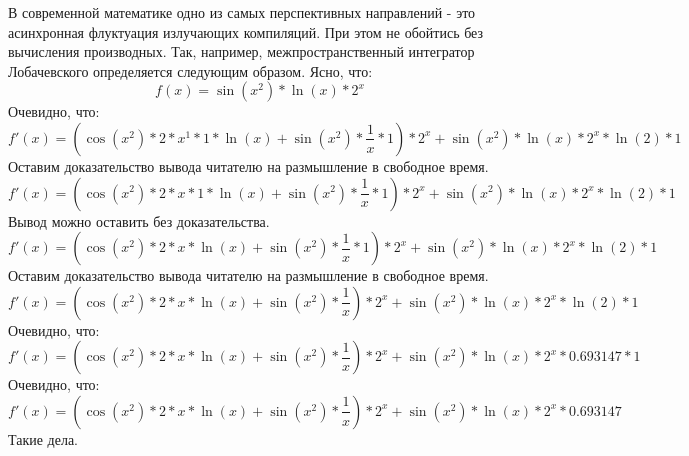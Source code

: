\documentclass{article}
\begin{document}
 

В современной математике одно из самых перспективных направлений - это асинхронная флуктуация излучающих компиляций. При этом не обойтись без вычисления производных. Так, например, межпространственный интегратор Лобачевского определяется следующим образом.
Ясно, что:
\begin{equation*}
f(x) = {{\sin\left({{x}^{2}}\right)} * {\ln\left({x}\right)}} * {{2}^{x}}
\end{equation*}
Очевидно, что:
\begin{equation*}
f'(x) = {{\left({{{\cos\left({{x}^{2}}\right)} * {{{2} * {{x}^{1}}} * {1}}} * {\ln\left({x}\right)}} + {{\sin\left({{x}^{2}}\right)} * {{\frac{1}{x}} * {1}}}\right)} * {{2}^{x}}} + {{{\sin\left({{x}^{2}}\right)} * {\ln\left({x}\right)}} * {{{{2}^{x}} * {\ln\left({2}\right)}} * {1}}}
\end{equation*}
Оставим доказательство вывода читателю на размышление в свободное время.
\begin{equation*}
f'(x) = {{\left({{{\cos\left({{x}^{2}}\right)} * {{{2} * {x}} * {1}}} * {\ln\left({x}\right)}} + {{\sin\left({{x}^{2}}\right)} * {{\frac{1}{x}} * {1}}}\right)} * {{2}^{x}}} + {{{\sin\left({{x}^{2}}\right)} * {\ln\left({x}\right)}} * {{{{2}^{x}} * {\ln\left({2}\right)}} * {1}}}
\end{equation*}
Вывод можно оставить без доказательства.
\begin{equation*}
f'(x) = {{\left({{{\cos\left({{x}^{2}}\right)} * {{2} * {x}}} * {\ln\left({x}\right)}} + {{\sin\left({{x}^{2}}\right)} * {{\frac{1}{x}} * {1}}}\right)} * {{2}^{x}}} + {{{\sin\left({{x}^{2}}\right)} * {\ln\left({x}\right)}} * {{{{2}^{x}} * {\ln\left({2}\right)}} * {1}}}
\end{equation*}
Оставим доказательство вывода читателю на размышление в свободное время.
\begin{equation*}
f'(x) = {{\left({{{\cos\left({{x}^{2}}\right)} * {{2} * {x}}} * {\ln\left({x}\right)}} + {{\sin\left({{x}^{2}}\right)} * {\frac{1}{x}}}\right)} * {{2}^{x}}} + {{{\sin\left({{x}^{2}}\right)} * {\ln\left({x}\right)}} * {{{{2}^{x}} * {\ln\left({2}\right)}} * {1}}}
\end{equation*}
Очевидно, что:
\begin{equation*}
f'(x) = {{\left({{{\cos\left({{x}^{2}}\right)} * {{2} * {x}}} * {\ln\left({x}\right)}} + {{\sin\left({{x}^{2}}\right)} * {\frac{1}{x}}}\right)} * {{2}^{x}}} + {{{\sin\left({{x}^{2}}\right)} * {\ln\left({x}\right)}} * {{{{2}^{x}} * {0.693147}} * {1}}}
\end{equation*}
Очевидно, что:
\begin{equation*}
f'(x) = {{\left({{{\cos\left({{x}^{2}}\right)} * {{2} * {x}}} * {\ln\left({x}\right)}} + {{\sin\left({{x}^{2}}\right)} * {\frac{1}{x}}}\right)} * {{2}^{x}}} + {{{\sin\left({{x}^{2}}\right)} * {\ln\left({x}\right)}} * {{{2}^{x}} * {0.693147}}}
\end{equation*}
Такие дела.
\end{document}
